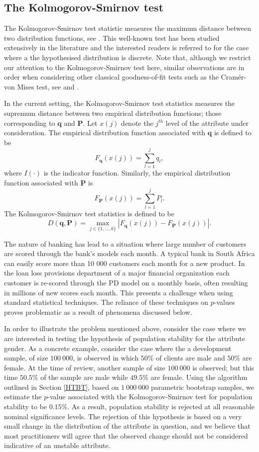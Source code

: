 \documentclass{article}
\theoremstyle{def}
\begin{document}
\subsection{The Kolmogorov-Smirnov test}\label{KS}

The Kolmogorov-Smirnov test statistic measures the maximum distance between two distribution functions, see \cite{Kol1933}. This well-known test has been studied extensively in the literature and the interested readers is referred to \cite{Con1972} for the case where a the hypothesised distribution is discrete. Note that, although we restrict our attention to the Kolmogorov-Smirnov test here, similar observations are in order when considering other classical goodness-of-fit tests such as the Cram\'er-von Mises test, see \cite{Cra1928} and \cite{VM1928}.

In the current setting, the Kolmogorov-Smirnov test statistics measures the supremum distance between two empirical distribution functions; those corresponding to $\mathbf{q}$ and $\mathbf{P}$. Let $x(j)$ denote the $j^{th}$ level of the attribute under consideration. The empirical distribution function associated with $\mathbf{q}$ is defined to be
\[
    F_{\mathbf{q}}(x(j)) = \sum_{l=1}^j q_l,
\]
where $I(\cdot)$ is the indicator function. Similarly, the empirical distribution function associated with $\mathbf{P}$ is
\[
    F_{\mathbf{P}}(x(j)) = \sum_{l=1}^j P_l.
\]
The Kolmogorov-Smirnov test statistics is defined to be
\[
    D(\mathbf{q},\mathbf{P})=\max_{j \in \{1,\dots,k\}} | F_{\mathbf{q}}(x(j)) - F_{\mathbf{P}}(x(j)) |.
\]

The nature of banking has lead to a situation where large number of customers are scored through the bank's models each month. A typical bank in South Africa can easily score more than 10 000 customers each month for a new product. In the loan loss provisions department of a major financial organization each customer is re-scored through the PD model on a monthly basis, often resulting in millions of new scores each month. This presents a challenge when using standard statistical techniques. The reliance of these techniques on $p$-values proves problematic as a result of phenomena discussed below.

In order to illustrate the problem mentioned above, consider the case where we are interested in testing the hypothesis of population stability for the attribute gender. As a concrete example, consider the case where the a development sample, of size $100 \ 000$, is observed in which $50\%$ of clients are male and $50\%$ are female. At the time of review, another sample of size $100 \ 000$ is observed; but this time $50.5\%$ of the sample are male while $49.5\%$ are female. Using the algorithm outlined in Section \ref{HTBT}, based on $1 \ 000 \ 000$ parametric bootstrap samples, we estimate the $p$-value associated with the Kolmogorov-Smirnov test for population stability to be $0.15\%$. As a result, population stability is rejected at all reasonable nominal significance levels. The rejection of this hypothesis is based on a very small change in the distribution of the attribute in question, and we believe that most practitioners will agree that the observed change should not be considered indicative of an unstable attribute.
\end{document}
